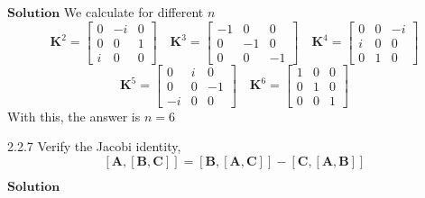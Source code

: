 \documentclass{article}
\begin{document}
\begin{flushleft}
$\boxed{\textbf{Solution}}$ We calculate for different $n$
$$\mathbf{K}^2 = \begin{bmatrix}{0} & {-i} & {0} \\ {0} & {0} & {1} \\ {i} & {0} & {0}\end{bmatrix} \quad \mathbf{K}^3=\begin{bmatrix}{-1} & {0} & {0} \\ {0} & {-1} & {0} \\ {0} & {0} & {-1}\end{bmatrix} \quad \mathbf{K}^4 = \begin{bmatrix}{0} & {0} & {-i} \\ {i} & {0} & {0} \\ {0} & {1} & {0}\end{bmatrix}$$
$$\mathbf{K}^5 = \begin{bmatrix}{0} & {i} & {0} \\ {0} & {0} & {-1} \\ {-i} & {0} & {0}\end{bmatrix} \quad \mathbf{K}^6 = \begin{bmatrix}{1} & {0} & {0} \\ {0} & {1} & {0} \\ {0} & {0} & {1}\end{bmatrix}$$
With this, the answer is $n=6$



\begin{mybox}{2.2.7}
Verify the Jacobi identity,
$$[\mathbf{A},[\mathbf{B}, \mathbf{C}]]=[\mathbf{B},[\mathbf{A}, \mathbf{C}]]-[\mathbf{C},[\mathbf{A}, \mathbf{B}]]$$
\end{mybox}

$\boxed{\textbf{Solution}}$ 


\end{flushleft}
\end{document}
